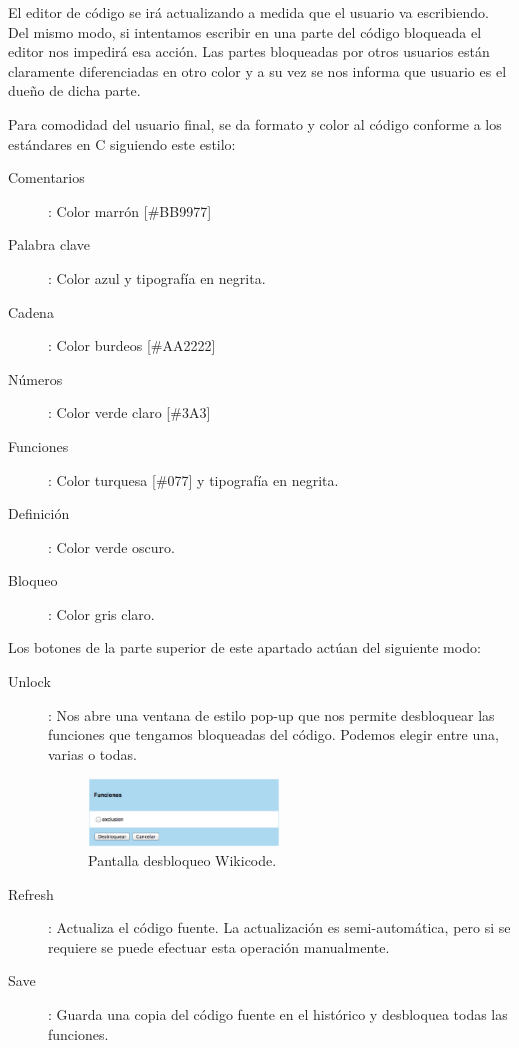 El editor de código se irá actualizando a medida que el usuario va escribiendo. Del mismo modo, si intentamos escribir en una parte del código bloqueada el editor nos impedirá esa acción. Las partes bloqueadas por otros usuarios están claramente diferenciadas en otro color y a su vez se nos informa que usuario es el dueño de dicha parte.

Para comodidad del usuario final, se da formato y color al código conforme a los estándares en C siguiendo este estilo:

\begin{description}
	\item[Comentarios]: Color marrón [\#BB9977]
	\item[Palabra clave]: Color azul y tipografía en negrita.
	\item[Cadena]: Color burdeos [\#AA2222]
	\item[Números]: Color verde claro [\#3A3]
	\item[Funciones]: Color turquesa [\#077] y tipografía en negrita.
	\item[Definición]: Color verde oscuro.
	\item[Bloqueo]: Color gris claro.
\end{description}

Los botones de la parte superior de este apartado actúan del siguiente modo:

\begin{description}
	\item[Unlock]: Nos abre una ventana de estilo pop-up que nos permite desbloquear las funciones que tengamos bloqueadas del código. Podemos elegir entre una, varias o todas.

\begin{figure}[h]
	\begin{center}
	\includegraphics[width=0.5\textwidth]{./img/c4unlock.eps}
	\caption{Pantalla desbloqueo Wikicode.}
	\end{center}
\end{figure}
	
	\item[Refresh]: Actualiza el código fuente. La actualización es semi-automática, pero si se requiere se puede efectuar esta operación manualmente.
	\item[Save]: Guarda una copia del código fuente en el histórico y desbloquea todas las funciones.
\end{description}

